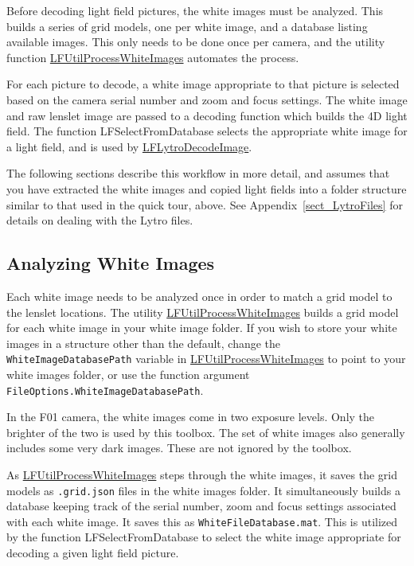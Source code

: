 \documentclass[onecolumn]{article}
\newcommand{\CiteFunc}[1]{\hyperlink{#1}{\small #1}}
\newcommand{\SupFunction}[1]{{\small #1}}
\newcommand{\SymbolText}[1]{\texttt{\small #1}}
\begin{document}
Before decoding light field pictures, the white images must be analyzed. This builds a series of grid models, one per white image, and a database listing available images. This only needs to be done once per camera, and the utility function \CiteFunc{LFUtilProcessWhiteImages} automates the process.

For each picture to decode, a white image appropriate to that picture is selected based on the camera serial number and zoom and focus settings. The white image and raw lenslet image are passed to a decoding function which builds the 4D light field. The function \SupFunction{LFSelectFromDatabase} selects the appropriate white image for a light field, and is used by \CiteFunc{LFLytroDecodeImage}.

The following sections describe this workflow in more detail, and assumes that you have extracted the white images and copied light fields into a folder structure similar to that used in the quick tour, above. See Appendix~\ref{sect_LytroFiles} for details on dealing with the Lytro files.

\subsection{Analyzing White Images}
\label{sect_AnalyzingWhiteImages}
Each white image needs to be analyzed once in order to match a grid model to the lenslet locations. The utility \CiteFunc{LFUtilProcessWhiteImages} builds a grid model for each white image in your white image folder. If you wish to store your white images in a structure other than the default, change the \SymbolText{WhiteImageDatabasePath} variable in \CiteFunc{LFUtilProcessWhiteImages} to point to your white images folder, or use the function argument \SymbolText{FileOptions.WhiteImageDatabasePath}.

In the F01 camera, the white images come in two exposure levels. Only the brighter of the two is used by this toolbox. The set of white images also generally includes some very dark images. These are not ignored by the toolbox.

As \CiteFunc{LFUtilProcessWhiteImages} steps through the white images, it saves the grid models as \SymbolText{.grid.json} files in the white images folder. It simultaneously builds a database keeping track of the serial number, zoom and focus settings associated with each white image. It saves this as \SymbolText{WhiteFileDatabase.mat}.  This is utilized by the function \SupFunction{LFSelectFromDatabase} to select the white image appropriate for decoding a given light field picture.
\end{document}
